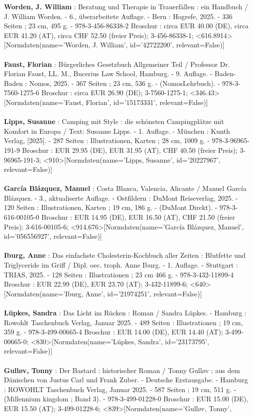 \documentclass{article}
\begin{document}
\begin{multicols}{3}

\textbf{Worden, J. William} : Beratung und Therapie in Trauerfällen : ein Handbuch / J. William Worden. - 6., überarbeitete Auflage. - Bern : Hogrefe, 2025. - 336 Seiten ; 23 cm, 495 g. - 978-3-456-86338-2 Broschur : circa EUR 40.00 (DE), circa EUR 41.20 (AT), circa CHF 52.50 (freier Preis); 3-456-86338-1; <616.8914>[Normdaten(name='Worden, J. William', id='42722200', relevant=False)]\\\\\textbf{Faust, Florian} : Bürgerliches Gesetzbuch Allgemeiner Teil / Professor Dr. Florian Faust, LL. M., Bucerius Law School, Hamburg. - 9. Auflage. - Baden-Baden : Nomos, 2025. - 367 Seiten ; 23 cm, 536 g. - (NomosLehrbuch). - 978-3-7560-1275-6 Broschur : circa EUR 26.90 (DE); 3-7560-1275-1; <346.43>[Normdaten(name='Faust, Florian', id='15173331', relevant=False)]\\\\\textbf{Lipps, Susanne} : Camping mit Style : die schönsten Campingplätze mit Komfort in Europa / Text: Susanne Lipps. - 1. Auflage. - München : Kunth Verlag, [2025]. - 287 Seiten : Illustrationen, Karten ; 28 cm, 1009 g. - 978-3-96965-191-9 Broschur : EUR 29.95 (DE), EUR 31.95 (AT), CHF 40.50 (freier Preis); 3-96965-191-3; <910>[Normdaten(name='Lipps, Susanne', id='20227967', relevant=False)]\\\\\textbf{García Blázquez, Manuel} : Costa Blanca, Valencia, Alicante / Manuel García Blázquez. - 3., aktualiserte Auflage. - Ostfildern : DuMont Reiseverlag, 2025. - 120 Seiten : Illustrationen, Karten ; 19 cm, 186 g. - (DuMont Direkt). - 978-3-616-00105-0 Broschur : EUR 14.95 (DE), EUR 16.50 (AT), CHF 21.50 (freier Preis); 3-616-00105-6; <914.676>[Normdaten(name='García Blázquez, Manuel', id='056556927', relevant=False)]\\\\\textbf{Iburg, Anne} : Das einfachste Cholesterin-Kochbuch aller Zeiten : Blutfette und Triglyceride im Griff / Dipl. oec. troph. Anne Iburg. - 1. Auflage. - Stuttgart : TRIAS, 2025. - 128 Seiten : Illustrationen ; 23 cm 466 g. - 978-3-432-11899-4 Broschur : EUR 22.99 (DE), EUR 23.70 (AT); 3-432-11899-6; <640>[Normdaten(name='Iburg, Anne', id='21974251', relevant=False)]\\\\\textbf{Lüpkes, Sandra} : Das Licht im Rücken : Roman / Sandra Lüpkes. - Hamburg : Rowohlt Taschenbuch Verlag, Januar 2025. - 489 Seiten : Illustrationen ; 19 cm, 359 g. - 978-3-499-00665-4 Broschur : EUR 14.00 (DE), EUR 14.40 (AT); 3-499-00665-0; <830>[Normdaten(name='Lüpkes, Sandra', id='23173795', relevant=False)]\\\\\textbf{Gulløv, Tonny} : Der Bastard : historischer Roman / Tonny Gulløv ; aus dem Dänischen von Justus Carl und Frank Zuber. - Deutsche Erstausgabe. - Hamburg : ROWOHLT Taschenbuch Verlag, Januar 2025. - 587 Seiten ; 19 cm, 511 g. - (Millennium kingdom ; Band 3). - 978-3-499-01228-0 Broschur : EUR 15.00 (DE), EUR 15.50 (AT); 3-499-01228-6; <839>[Normdaten(name='Gulløv, Tonny', 
\end{multicols}
\end{document}
